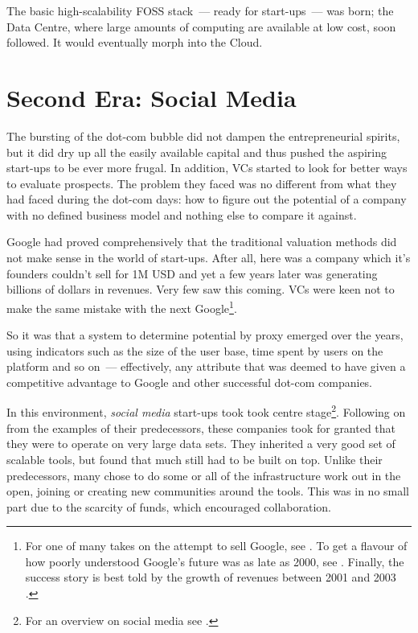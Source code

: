 \documentclass{book}
\begin{document}
The basic high-scalability FOSS stack~--- ready for start-ups~--- was
born; the Data Centre, where large amounts of computing are available
at low cost, soon followed. It would eventually morph into the Cloud.

\section{Second Era: Social Media}

The bursting of the dot-com bubble did not dampen the entrepreneurial
spirits, but it did dry up all the easily available capital and thus
pushed the aspiring start-ups to be ever more frugal. In addition, VCs
started to look for better ways to evaluate prospects. The problem
they faced was no different from what they had faced during the
dot-com days: how to figure out the potential of a company with no
defined business model and nothing else to compare it against.

Google had proved comprehensively that the traditional valuation
methods did not make sense in the world of start-ups. After all, here
was a company which it's founders couldn't sell for 1M USD and yet a
few years later was generating billions of dollars in revenues. Very
few saw this coming. VCs were keen not to make the same mistake with
the next Google\footnote{For one of many takes on the attempt to sell
  Google, see \cite{TechCrunch01}. To get a flavour of how poorly
  understood Google's future was as late as 2000, see
  \cite{Kopytoff01}. Finally, the success story is best told by the
  growth of revenues between 2001 and 2003 \cite{Google01}.}.

So it was that a system to determine potential by proxy emerged over
the years, using indicators such as the size of the user base, time
spent by users on the platform and so on~--- effectively, any
attribute that was deemed to have given a competitive advantage to
Google and other successful dot-com companies.

In this environment, \emph{social media} start-ups took took centre
stage\footnote{For an overview on social media see
  \cite{Wikipedia03}.}. Following on from the examples of their
predecessors, these companies took for granted that they were to
operate on very large data sets. They inherited a very good set of
scalable tools, but found that much still had to be built on
top. Unlike their predecessors, many chose to do some or all of the
infrastructure work out in the open, joining or creating new
communities around the tools. This was in no small part due to the
scarcity of funds, which encouraged collaboration.
\end{document}
